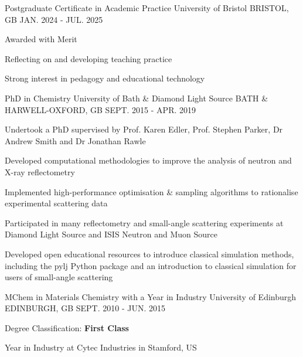 \begin{cventries}
  \cventry
    {Postgraduate Certificate in Academic Practice}
    {University of Bristol}
    {BRISTOL, GB}
    {JAN. 2024 - JUL. 2025}
    {
      \begin{cvitems}
        \item {Awarded with Merit}
        \item {Reflecting on and developing teaching practice}
        \item {Strong interest in pedagogy and educational technology}
      \end{cvitems}
    }
  \cventry
    {PhD in Chemistry}
    {University of Bath \& Diamond Light Source}
    {BATH \& HARWELL-OXFORD, GB}
    {SEPT. 2015 - APR. 2019}
    {
      \begin{cvitems}
        \item {Undertook a PhD supervised by Prof. Karen Edler, Prof. Stephen Parker, Dr Andrew Smith and Dr Jonathan Rawle}
        \item {Developed computational methodologies to improve the analysis of neutron and X-ray reflectometry}
        \item {Implemented high-performance optimisation \& sampling algorithms to rationalise experimental scattering data}
        \item {Participated in many reflectometry and small-angle scattering experiments at Diamond Light Source and ISIS Neutron and Muon Source}
        \item {Developed open educational resources to introduce classical simulation methods, including the pylj Python package and an introduction to classical simulation for users of small-angle scattering}
      \end{cvitems}
    }
  \cventry
    {MChem in Materials Chemistry with a Year in Industry}
    {University of Edinburgh}
    {EDINBURGH, GB}
    {SEPT. 2010 - JUN. 2015}
    {
      \begin{cvitems}
        \item {Degree Classification: \textbf{First Class}}
        \item {Year in Industry at Cytec Industries in Stamford, US}
      \end{cvitems}
    }
\end{cventries}
